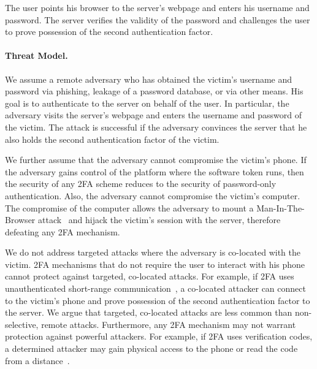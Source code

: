 The user points his browser to the server's webpage and enters his username and password.
The server verifies the validity of the password and challenges the user to prove possession of the second authentication factor.

\paragraph{Threat Model.}
We assume a remote adversary who has obtained the victim's username and password via phishing, leakage of a password database, or via other means.
His goal is to authenticate to the server on behalf of the user.
In particular, the adversary visits  the server's webpage and enters the username and password of the victim.
The attack is successful if the adversary convinces the server that he also holds the second authentication factor of the victim.

We further assume that the adversary cannot compromise the victim's phone.
If the adversary gains control of the platform where the software token runs, then the security of any 2FA scheme reduces to the security of password-only authentication.
Also, the adversary cannot compromise the victim's computer.
The compromise of the computer allows the adversary to mount a Man-In-The-Browser attack~\cite{owasp_mitb} and hijack the victim's session with the server, therefore defeating any 2FA mechanism.

We do not address targeted attacks where the adversary is co-located with the victim.
2FA mechanisms that do not require the user to interact with his phone cannot protect against targeted, co-located attacks.
For example, if 2FA uses unauthenticated short-range communication~\cite{czeskis12ccs}, a co-located attacker can connect to the victim's phone and prove possession of the second authentication factor to the server.
We argue that targeted, co-located attacks are less common than non-selective, remote attacks.
Furthermore, any 2FA mechanism may not warrant protection against powerful attackers.
For example, if 2FA uses verification codes, a determined attacker may gain physical access to the phone or read the code from a distance~\cite{backes09sp,backes08sp,raguram11ccs}.


